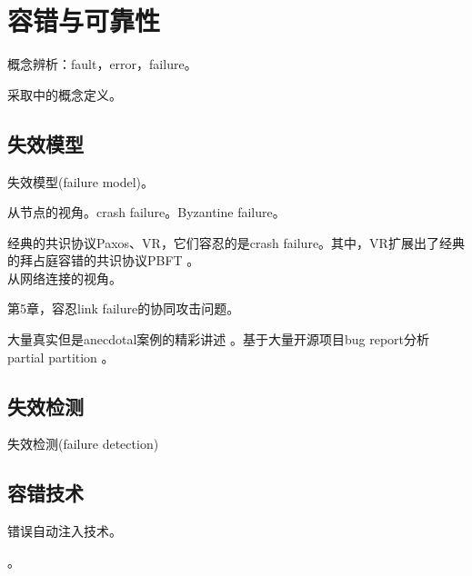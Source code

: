 \chapter{容错与可靠性}

概念辨析：fault，error，failure。

\myleaf 采取\cite{Yuan14}中的概念定义。

\section{失效模型}

失效模型(failure model)。

从节点的视角。crash failure。Byzantine failure。

\myleaf 经典的共识协议Paxos\cite{Lamport01}、VR\cite{Oki88}，它们容忍的是crash failure。其中，VR扩展出了经典的拜占庭容错的共识协议PBFT \cite{Castro02}。\\


从网络连接的视角。

\myleaf \cite{Lynch96-textbook}第5章，容忍link failure的协同攻击问题。

\myleaf 大量真实但是anecdotal案例的精彩讲述 \cite{Bailis14-cacm}。基于大量开源项目bug report分析partial partition \cite{Alfatafta20}。

\section{失效检测}

失效检测(failure detection)

\section{容错技术}

错误自动注入技术。

\myleaf \cite{Alvaro18}。